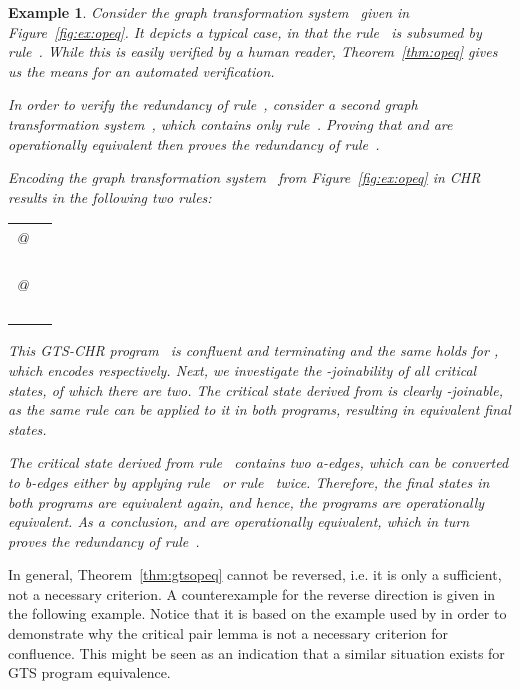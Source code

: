 \documentclass{tlp}
\newtheorem{example}{Example}[section]
\begin{document}
\begin{example}

Consider the graph transformation system~ given in
Figure~\ref{fig:ex:opeq}. It depicts a typical case, in that the rule~ is
subsumed by rule~. While this is easily verified by a human reader,
Theorem~\ref{thm:opeq} gives us the means for an automated verification.

In order to verify the redundancy of rule~, consider a second graph
transformation system~, which contains only rule~. Proving that
 and  are operationally equivalent then proves the redundancy of
rule~.

Encoding the graph transformation system~ from Figure~\ref{fig:ex:opeq}
in CHR results in the following two rules:\\
\begin{tabular}{ll}
 @ & 
\\
&  \\
& \\
\\
 @ & \\
&  \\
&  \\
& \\
& 
\end{tabular}

This GTS-CHR program~ is confluent and terminating and the same holds for
, which encodes  respectively. Next, we investigate the
-joinability of all critical states, of which there are two. The critical
state derived from  is clearly -joinable, as the same rule can be
applied to it in both programs, resulting in equivalent final states.

The critical state derived from rule~ contains two a-edges, which can be
converted to b-edges either by applying rule~ or rule~ twice. Therefore,
the final states in both programs are equivalent again, and hence, the programs
are operationally equivalent. As a conclusion,  and  are
operationally equivalent, which in turn proves the redundancy of rule~.

\end{example}

In general, Theorem~\ref{thm:gtsopeq} cannot be reversed, i.e. it is only a
sufficient, not a necessary criterion. A counterexample for the reverse direction
is given in the following example. Notice that it is based on the example used by
\cite{plump05} in order to demonstrate why the critical pair lemma is not a
necessary criterion for confluence. This might be seen as an indication that a
similar situation exists for GTS program equivalence.
\end{document}
